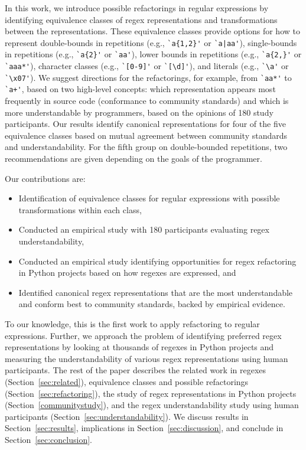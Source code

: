 In this work, we introduce possible refactorings in regular expressions by identifying equivalence classes of regex representations and transformations between the representations. 
These equivalence classes provide options for how to represent double-bounds in repetitions (e.g., \verb!`a{1,2}'! or \verb!`a|aa'!), single-bounds in repetitions (e.g., \verb!`a{2}'! or \verb!`aa'!), lower bounds in repetitions (e.g., \verb!`a{2,}'! or \verb!`aaa*'!), character classes (e.g., \verb!`[0-9]'! or \verb!`[\d]'!), and literals (e.g., \verb!`\a'! or \verb!`\x07'!). 
We suggest directions for the refactorings, for example, from \verb!`aa*'!  to  \verb!`a+'!, based on two high-level concepts: which representation appears most frequently in source code (conformance to community standards) and which is more understandable by programmers, based on the opinions of 180 study participants. 
Our results identify canonical representations for four of the five equivalence classes based on mutual agreement between community standards and understandability. For the fifth group on double-bounded repetitions, two recommendations are given depending on the goals of the programmer. 

Our contributions are:
\begin{itemize}
\item Identification of  equivalence classes for regular expressions with possible transformations within each class,
\item Conducted an empirical study with 180 participants evaluating regex understandability,
\item Conducted an empirical study identifying opportunities for regex refactoring  in Python projects based on how regexes are expressed, and
\item {Identified canonical regex representations that are the most understandable and conform best to community standards, backed by empirical evidence.}
\end{itemize}

To our knowledge, this is the first work to apply refactoring to regular expressions. Further, we approach the problem of identifying preferred regex representations by looking at thousands of regexes in Python projects and measuring the understandability of various regex representations using human participants. The rest of the paper describes the related work in regexes (Section~\ref{sec:related}), equivalence classes and possible refactorings (Section~\ref{sec:refactoring}), the study of regex representations in Python projects (Section~\ref{communitystudy}), and the regex understandability study using human participants (Section~\ref{sec:understandability}). We discuss results in Section~\ref{sec:results}, implications in Section~\ref{sec:discussion}, and conclude in Section~\ref{sec:conclusion}. 

%

